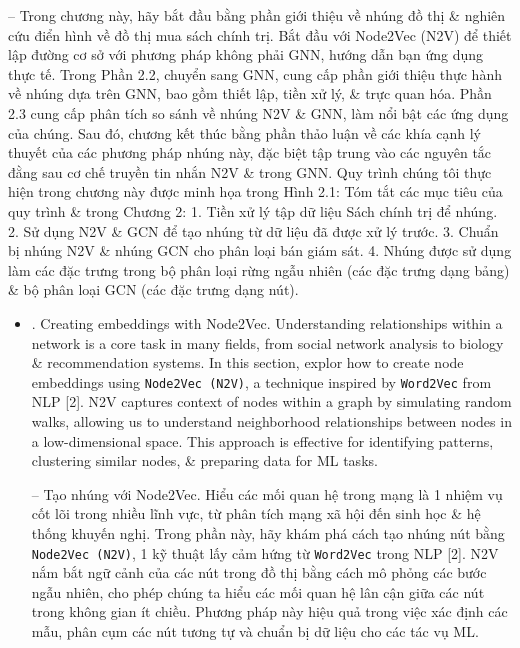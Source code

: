 \documentclass{article}
\begin{document}
\begin{itemize}
    -- Trong chương này, hãy bắt đầu bằng phần giới thiệu về nhúng đồ thị \& nghiên cứu điển hình về đồ thị mua sách chính trị. Bắt đầu với Node2Vec (N2V) để thiết lập đường cơ sở với phương pháp không phải GNN, hướng dẫn bạn ứng dụng thực tế. Trong Phần 2.2, chuyển sang GNN, cung cấp phần giới thiệu thực hành về nhúng dựa trên GNN, bao gồm thiết lập, tiền xử lý, \& trực quan hóa. Phần 2.3 cung cấp phân tích so sánh về nhúng N2V \& GNN, làm nổi bật các ứng dụng của chúng. Sau đó, chương kết thúc bằng phần thảo luận về các khía cạnh lý thuyết của các phương pháp nhúng này, đặc biệt tập trung vào các nguyên tắc đằng sau cơ chế truyền tin nhắn N2V \& trong GNN. Quy trình chúng tôi thực hiện trong chương này được minh họa trong {\sf Hình 2.1: Tóm tắt các mục tiêu của quy trình \& trong Chương 2: 1. Tiền xử lý tập dữ liệu Sách chính trị để nhúng. 2. Sử dụng N2V \& GCN để tạo nhúng từ dữ liệu đã được xử lý trước. 3. Chuẩn bị nhúng N2V \& nhúng GCN cho phân loại bán giám sát. 4. Nhúng được sử dụng làm các đặc trưng trong bộ phân loại rừng ngẫu nhiên (các đặc trưng dạng bảng) \& bộ phân loại GCN (các đặc trưng dạng nút).}
    \begin{itemize}
        \item {. Creating embeddings with Node2Vec.} Understanding relationships within a network is a core task in many fields, from social network analysis to biology \& recommendation systems. In this section, explor how to create node embeddings using {\tt Node2Vec (N2V)}, a technique inspired by {\tt Word2Vec} from NLP [2]. N2V captures context of nodes within a graph by simulating random walks, allowing us to understand neighborhood relationships between nodes in a low-dimensional space. This approach is effective for identifying patterns, clustering similar nodes, \& preparing data for ML tasks.

        -- {\sf Tạo nhúng với Node2Vec.} Hiểu các mối quan hệ trong mạng là 1 nhiệm vụ cốt lõi trong nhiều lĩnh vực, từ phân tích mạng xã hội đến sinh học \& hệ thống khuyến nghị. Trong phần này, hãy khám phá cách tạo nhúng nút bằng {\tt Node2Vec (N2V)}, 1 kỹ thuật lấy cảm hứng từ {\tt Word2Vec} trong NLP [2]. N2V nắm bắt ngữ cảnh của các nút trong đồ thị bằng cách mô phỏng các bước ngẫu nhiên, cho phép chúng ta hiểu các mối quan hệ lân cận giữa các nút trong không gian ít chiều. Phương pháp này hiệu quả trong việc xác định các mẫu, phân cụm các nút tương tự và chuẩn bị dữ liệu cho các tác vụ ML.


\end{itemize}
\end{itemize}
\end{document}
